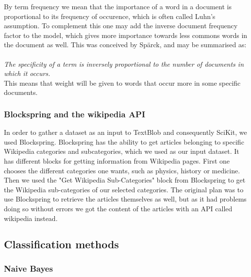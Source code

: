 \documentclass[a4paper]{article}
\begin{document}
By term frequency we mean that the importance of a word in a document is proportional to its frequency of occurence, which is often called Luhn's assumption\cite{luhn}. To complement this one may add the inverse document frequency factor to the model, which gives more importance towards less commons words in the document as well. This was conceived by Spärck\cite{sparck}, and may be summarised as:\\
\\
\textit{The specificity of a term is inversely proportional to the number of documents in which it occurs.} \\

This means that weight will be given to words that occur more in some specific documents.
\subsubsection{Blockspring and the wikipedia API}

In order to gather a dataset as an input to TextBlob and consequently SciKit, we used Blockspring. Blockspring has the ability to get articles belonging to specific Wikipedia categories and subcategories, which we used as our input dataset. It has different blocks for getting information from Wikipedia pages. First one chooses the different categories one wants, such as physics, history or medicine. Then we used the "Get Wikipedia Sub-Categories" block from Blockspring to get the Wikipedia sub-categories of our selected categories. The original plan was to use Blockspring to retrieve the articles themselves as well, but as it had problems doing so without errors we got the content of the articles with an API called wikipedia instead. 




\subsection{Classification methods}
\subsubsection{Naive Bayes}
\end{document}
